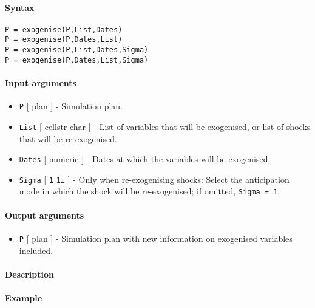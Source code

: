 


	\paragraph{Syntax}

\begin{verbatim}
P = exogenise(P,List,Dates)
P = exogenise(P,Dates,List)
P = exogenise(P,List,Dates,Sigma)
P = exogenise(P,Dates,List,Sigma)
\end{verbatim}

\paragraph{Input arguments}

\begin{itemize}
\item
  \texttt{P} {[} plan {]} - Simulation plan.
\item
  \texttt{List} {[} cellstr \textbar{} char {]} - List of variables that
  will be exogenised, or list of shocks that will be re-exogenised.
\item
  \texttt{Dates} {[} numeric {]} - Dates at which the variables will be
  exogenised.
\item
  \texttt{Sigma} {[} \texttt{1} \textbar{} \texttt{1i} {]} - Only when
  re-exogenising shocks: Select the anticipation mode in which the shock
  will be re-exogenised; if omitted, \texttt{Sigma = 1}.
\end{itemize}

\paragraph{Output arguments}

\begin{itemize}
\itemsep1pt\parskip0pt
\item
  \texttt{P} {[} plan {]} - Simulation plan with new information on
  exogenised variables included.
\end{itemize}

\paragraph{Description}

\paragraph{Example}


